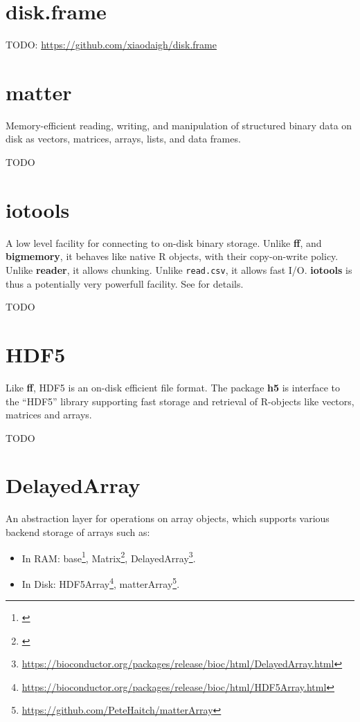 \documentclass[]{book}
\providecommand{\tightlist}{%
  \setlength{\itemsep}{0pt}\setlength{\parskip}{0pt}}
\renewcommand{\href}[2]{#2\footnote{\url{#1}}}
\theoremstyle{definition}
\theoremstyle{definition}
\theoremstyle{definition}
\theoremstyle{remark}
\begin{document}
\hypertarget{disk.frame}{%
\section{disk.frame}\label{disk.frame}}

TODO: \url{https://github.com/xiaodaigh/disk.frame}

\hypertarget{matter}{%
\section{matter}\label{matter}}

Memory-efficient reading, writing, and manipulation of structured binary data on disk as vectors, matrices, arrays, lists, and data frames.

TODO

\hypertarget{iotools}{%
\section{iotools}\label{iotools}}

A low level facility for connecting to on-disk binary storage.
Unlike \textbf{ff}, and \textbf{bigmemory}, it behaves like native R objects, with their copy-on-write policy.
Unlike \textbf{reader}, it allows chunking.
Unlike \texttt{read.csv}, it allows fast I/O.
\textbf{iotools} is thus a potentially very powerfull facility.
See \citet{arnold2015iotools} for details.

TODO

\hypertarget{hdf5}{%
\section{HDF5}\label{hdf5}}

Like \textbf{ff}, HDF5 is an on-disk efficient file format.
The package \textbf{h5} is interface to the ``HDF5'' library supporting fast storage and retrieval of R-objects like vectors, matrices and arrays.

TODO

\hypertarget{delayedarray}{%
\section{DelayedArray}\label{delayedarray}}

An abstraction layer for operations on array objects, which supports various backend storage of arrays such as:

\begin{itemize}
\tightlist
\item
  In RAM: \href{}{base}, \href{}{Matrix}, \href{https://bioconductor.org/packages/release/bioc/html/DelayedArray.html}{DelayedArray}.
\item
  In Disk: \href{https://bioconductor.org/packages/release/bioc/html/HDF5Array.html}{HDF5Array}, \href{https://github.com/PeteHaitch/matterArray}{matterArray}.
\end{itemize}
\end{document}
